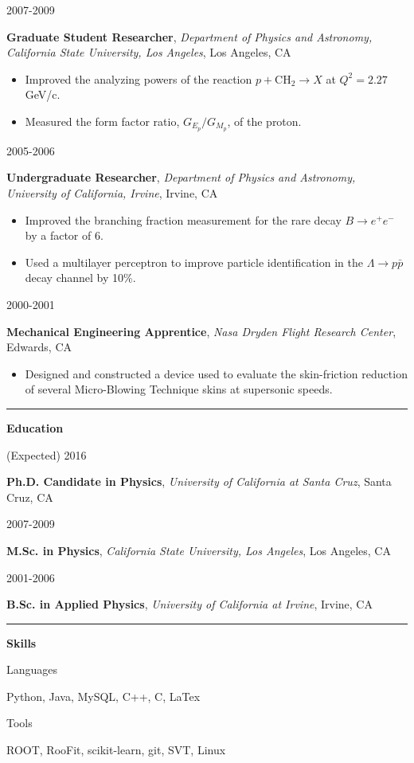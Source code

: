 \documentclass[11pt]{article}
\newcommand{\resumesection}[1] {
    \vspace{20pt}
    \noindent
    \textcolor{MidnightBlue!50!White}{\rule{.15\textwidth}{5pt} \hspace{0.05} \textbf{\large{#1}}} \newline
}
\newcommand{\experienceentry}[5] { 
    \noindent
    \begin{minipage}[t]{0.15\textwidth} \begin{flushright} #1 \end{flushright} \end{minipage} \hspace{0.05}
    \begin{minipage}[t]{0.85\textwidth} 
        \textbf{#2}, \emph{#3}, #4 
        #5
    \end{minipage}
}
\newcommand{\educationentry}[4] { 
    \noindent
    \begin{minipage}[t]{0.15\textwidth} \begin{flushright} #1 \end{flushright} \end{minipage} \hspace{0.05}
    \begin{minipage}[t]{0.85\textwidth} 
        \textbf{#2}, \emph{#3}, #4
    \end{minipage}
}
\newcommand{\skillsentry}[2] { 
    \noindent
    \begin{minipage}[t]{0.15\textwidth} \begin{flushright} #1 \end{flushright} \end{minipage} \hspace{0.05}
    \begin{minipage}[t]{0.85\textwidth} #2 \end{minipage}
}
\begin{document}
        \experienceentry{2007-2009}
                        {Graduate Student Researcher}
                        {Department of Physics and Astronomy, California State University, Los Angeles}
                        {Los Angeles, CA}
                        {
                          \begin{itemize}[noitemsep, nolistsep, leftmargin=*]
                            \item Improved the analyzing powers of the reaction 
                                  $p + \mbox{CH}_2 \rightarrow X$ at $Q^2 = 2.27$ GeV/c.
                            \item Measured the form factor ratio, $G_{E_p}/G_{M_p}$, of the proton. 
                          \end{itemize}
                        } 
        \experienceentry{2005-2006}
                        {Undergraduate Researcher}
                        {Department of Physics and Astronomy, University of California, Irvine}
                        {Irvine, CA}
                        { 
                          \begin{itemize}[noitemsep, nolistsep, leftmargin=*]
                            \item Improved the branching fraction measurement for the rare decay 
                                  $B\rightarrow e^+e^-$ by a factor of 6.
                            \item Used a multilayer perceptron to improve particle identification in the 
                                  $\Lambda \rightarrow p \bar{p}$ decay channel by 10\%.  
                          \end{itemize}
                       } \newline
        \experienceentry{2000-2001}
                        {Mechanical Engineering Apprentice}
                        {Nasa Dryden Flight Research Center}
                        {Edwards, CA}
                        {
                          \begin{itemize}[noitemsep, nolistsep, leftmargin=*]
                            \item Designed and constructed a device used to evaluate the skin-friction reduction 
                                  of several Micro-Blowing Technique skins at supersonic speeds. 
                          \end{itemize}
                       }

    \resumesection{Education}
        \educationentry{(Expected) 2016}
                       {Ph.D. Candidate in Physics}
                       {University of California at Santa Cruz}
                       {Santa Cruz, CA}
        \educationentry{2007-2009}
                       {M.Sc. in Physics}
                       {California State University, Los Angeles}
                       {Los Angeles, CA}
        \educationentry{2001-2006}
                       {B.Sc. in Applied Physics}
                       {University of California at Irvine}
                       {Irvine, CA}

    \resumesection{Skills}
        \skillsentry{Languages}{Python, Java, MySQL, C++, C, LaTex}
        \skillsentry{Tools}{ROOT, RooFit, scikit-learn, git, SVT, Linux}
\end{document}
